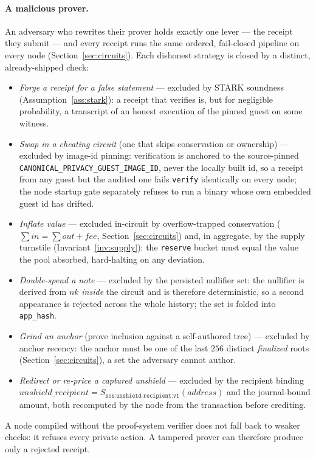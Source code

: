 \documentclass[11pt]{article}
\newcommand{\code}[1]{\texttt{#1}}
\theoremstyle{plain}
\theoremstyle{definition}
\theoremstyle{remark}
\begin{document}
\paragraph{A malicious prover.} An adversary who rewrites their prover holds
exactly one lever --- the receipt they submit --- and every receipt runs the
same ordered, fail-closed pipeline on every node
(Section~\ref{sec:circuits}). Each dishonest strategy is closed by a distinct,
already-shipped check:
\begin{itemize}[leftmargin=1.6em]
\item \emph{Forge a receipt for a false statement} --- excluded by STARK
  soundness (Assumption~\ref{ass:stark}): a receipt that verifies is, but for
  negligible probability, a transcript of an honest execution of the pinned
  guest on some witness.
\item \emph{Swap in a cheating circuit} (one that skips conservation or
  ownership) --- excluded by image-id pinning: verification is anchored to
  the source-pinned \code{CANONICAL\_PRIVACY\_GUEST\_IMAGE\_ID}, never the
  locally built id, so a receipt from any guest but the audited one fails
  \code{verify} identically on every node; the node startup gate separately
  refuses to run a binary whose own embedded guest id has drifted.
\item \emph{Inflate value} --- excluded in-circuit by overflow-trapped
  conservation ($\sum \mathit{in} = \sum \mathit{out} + \mathit{fee}$,
  Section~\ref{sec:circuits}) and, in aggregate, by the supply turnstile
  (Invariant~\ref{inv:supply}): the \code{reserve} bucket must equal the value
  the pool absorbed, hard-halting on any deviation.
\item \emph{Double-spend a note} --- excluded by the persisted nullifier set:
  the nullifier is derived from $\mathit{nk}$ \emph{inside} the circuit and is
  therefore deterministic, so a second appearance is rejected across the whole
  history; the set is folded into \code{app\_hash}.
\item \emph{Grind an anchor} (prove inclusion against a self-authored tree)
  --- excluded by anchor recency: the anchor must be one of the last $256$
  distinct \emph{finalized} roots (Section~\ref{sec:circuits}), a set the
  adversary cannot author.
\item \emph{Redirect or re-price a captured unshield} --- excluded by the
  recipient binding $\mathit{unshield\_recipient} =
  S_{\code{sos:unshield-recipient:v1}}(\mathit{address})$ and the
  journal-bound amount, both recomputed by the node from the transaction
  before crediting.
\end{itemize}
A node compiled without the proof-system verifier does not fall back to weaker
checks: it refuses every private action. A tampered prover can therefore
produce only a rejected receipt.
\end{document}
